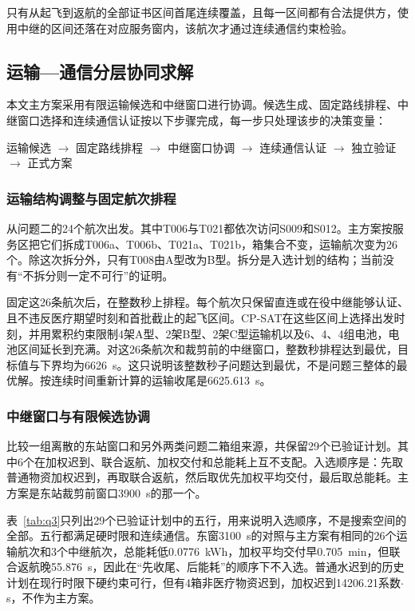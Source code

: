 只有从起飞到返航的全部证书区间首尾连续覆盖，且每一区间都有合法提供方，使用中继的区间还落在对应服务窗内，该航次才通过连续通信约束检验。

\subsection{运输—通信分层协同求解}

本文主方案采用有限运输候选和中继窗口进行协调。候选生成、固定路线排程、中继窗口选择和连续通信认证按以下步骤完成，每一步只处理该步的决策变量：
\begin{center}
运输候选 $\rightarrow$ 固定路线排程 $\rightarrow$ 中继窗口协调 $\rightarrow$ 连续通信认证 $\rightarrow$ 独立验证 $\rightarrow$ 正式方案
\end{center}

\subsubsection{运输结构调整与固定航次排程}

从问题二的24个航次出发。其中T006与T021都依次访问S009和S012。主方案按服务区把它们拆成T006a、T006b、T021a、T021b，箱集合不变，运输航次变为26个。除这次拆分外，只有T008由A型改为B型。拆分是入选计划的结构；当前没有“不拆分则一定不可行”的证明。

固定这26条航次后，在整数秒上排程。每个航次只保留直连或在役中继能够认证、且不违反医疗期望时刻和首批截止的起飞区间。CP-SAT在这些区间上选择出发时刻，并用累积约束限制4架A型、2架B型、2架C型运输机以及6、4、4组电池，电池区间延长到充满。对这26条航次和裁剪前的中继窗口，整数秒排程达到最优，目标值与下界均为6626~s。这只说明该整数秒子问题达到最优，不是问题三整体的最优解。按连续时间重新计算的运输收尾是6625.613~s。

\subsubsection{中继窗口与有限候选协调}

比较一组离散的东站窗口和另外两类问题二箱组来源，共保留29个已验证计划。其中6个在加权迟到、联合返航、加权交付和总能耗上互不支配。入选顺序是：先取普通物资加权迟到，再取联合返航，然后取优先加权平均交付，最后取总能耗。主方案是东站裁剪前窗口3900~s的那一个。

表~\ref{tab:q3}只列出29个已验证计划中的五行，用来说明入选顺序，不是搜索空间的全部。五行都满足硬时限和连续通信。东窗3100~s的对照与主方案有相同的26个运输航次和3个中继航次，总能耗低0.0776~kWh，加权平均交付早0.705~min，但联合返航晚55.876~s，因此在“先收尾、后能耗”的顺序下不入选。普通水迟到的历史计划在现行时限下硬约束可行，但有4箱非医疗物资迟到，加权迟到14206.21系数$\cdot$s，不作为主方案。

